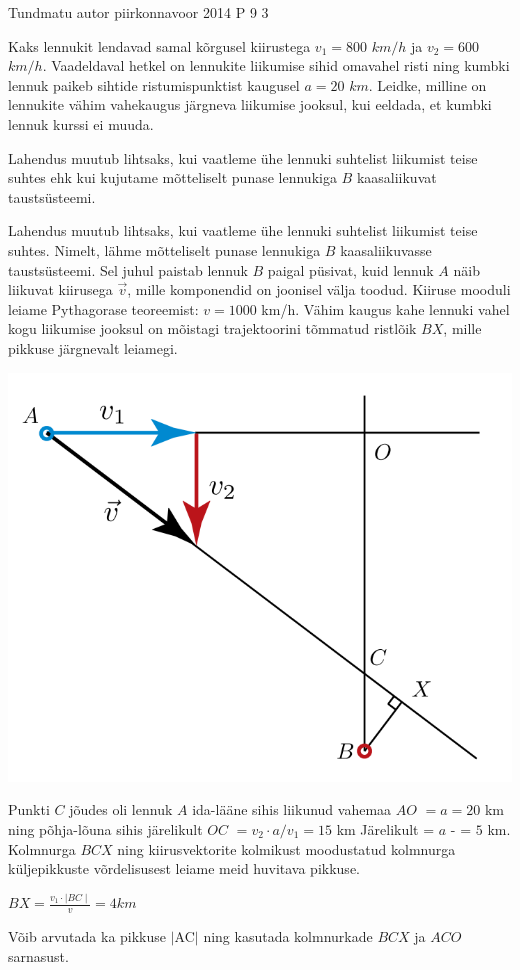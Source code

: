 {Tundmatu autor} %
{piirkonnavoor} %
{2014} %
{P 9} %
{3} %
{
\ifStatement
Kaks lennukit lendavad samal kõrgusel kiirustega $v_1 = 800$ $km/h$ ja $v_2 = 600$ $km/h$. Vaadeldaval hetkel on lennukite liikumise sihid omavahel risti ning kumbki lennuk paikeb sihtide ristumispunktist kaugusel $a = 20$ $km$. Leidke, milline on lennukite vähim vahekaugus järgneva liikumise jooksul, kui eeldada, et kumbki lennuk kurssi ei muuda.\fi


\ifHint
Lahendus muutub lihtsaks, kui vaatleme ühe lennuki suhtelist liikumist teise suhtes ehk kui kujutame mõtteliselt punase lennukiga $B$ kaasaliikuvat taustsüsteemi.
\fi

\ifSolution
Lahendus muutub lihtsaks, kui vaatleme ühe lennuki suhtelist liikumist teise suhtes. Nimelt, lähme mõtteliselt punase lennukiga $B$ kaasaliikuvasse taustsüsteemi. Sel juhul paistab lennuk $B$ paigal püsivat, kuid lennuk $A$ näib liikuvat kiirusega $\vec{v}$, mille komponendid on joonisel välja toodud. Kiiruse mooduli leiame Pythagorase teoreemist: $v = 1000$ km/h. Vähim kaugus kahe lennuki vahel kogu liikumise jooksul on mõistagi trajektoorini tõmmatud ristlõik $BX$, mille pikkuse järgnevalt leiamegi.
\begin{center}
	\includegraphics[width=0.5\linewidth]{2014-v2p-09-lah.png}
\end{center}
Punkti $C$ jõudes oli lennuk $A$ ida-lääne sihis liikunud vahemaa \textbar$AO$\textbar$ $ $= a = 20$ km ning põhja-lõuna sihis järelikult \textbar $OC$\textbar $ $ $= v_2 \cdot a/v_1 = 15$ km
Järelikult \textbar = $a$ - \textbar = $5$ km.
Kolmnurga $BCX$ ning kiirusvektorite kolmikust moodustatud kolmnurga küljepikkuste võrdelisusest leiame meid huvitava pikkuse.
\begin{center}
\textbar $BX$\textbar $= \frac {v_1\cdot\mid{BC}\mid}{v} = 4 km$
\end{center}
Võib arvutada ka pikkuse $\mid$AC$\mid$ ning kasutada kolmnurkade $BCX$ ja $ACO$ sarnasust.
\fi
}